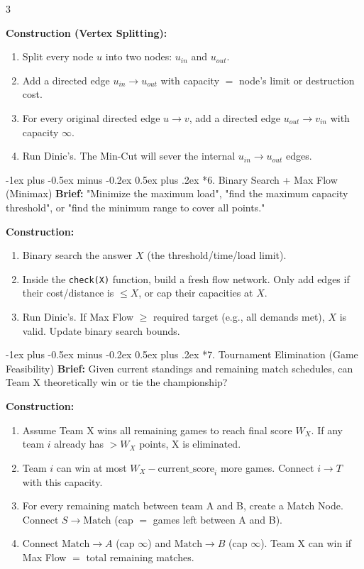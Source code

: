 \documentclass[8pt,a4paper,onesided]{article}
\makeatletter
\renewcommand{\subsection}{\@startsection{subsection}{2}{0mm}
    {-1ex plus -0.5ex minus -0.2ex} %
    {0.5ex plus .2ex}                %
    {\normalfont\large\bfseries}}    %
\makeatother
\begin{document}
\begin{multicols}{3}
{\textbf{Construction (Vertex Splitting):}
\begin{enumerate}
    \item Split every node $u$ into two nodes: $u_{in}$ and $u_{out}$.
    \item Add a directed edge $u_{in} \to u_{out}$ with capacity $=$ node's limit or destruction cost.
    \item For every original directed edge $u \to v$, add a directed edge $u_{out} \to v_{in}$ with capacity $\infty$.
    \item Run Dinic's. The Min-Cut will sever the internal $u_{in} \to u_{out}$ edges.
\end{enumerate}


\subsection*{6. Binary Search + Max Flow (Minimax)}
\textbf{Brief:} "Minimize the maximum load", "find the maximum capacity threshold", or "find the minimum range to cover all points."

\textbf{Construction:}
\begin{enumerate}
    \item Binary search the answer $X$ (the threshold/time/load limit).
    \item Inside the \texttt{check(X)} function, build a fresh flow network. Only add edges if their cost/distance is $\le X$, or cap their capacities at $X$.
    \item Run Dinic's. If Max Flow $\ge$ required target (e.g., all demands met), $X$ is valid. Update binary search bounds.
\end{enumerate}


\subsection*{7. Tournament Elimination (Game Feasibility)}
\textbf{Brief:} Given current standings and remaining match schedules, can Team X theoretically win or tie the championship?

\textbf{Construction:}
\begin{enumerate}
    \item Assume Team X wins all remaining games to reach final score $W_X$. If any team $i$ already has $> W_X$ points, X is eliminated.
    \item Team $i$ can win at most $W_X - \text{current\_score}_i$ more games. Connect $i \to T$ with this capacity.
    \item For every remaining match between team A and B, create a Match Node. Connect $S \to \text{Match}$ (cap $=$ games left between A and B).
    \item Connect $\text{Match} \to A$ (cap $\infty$) and $\text{Match} \to B$ (cap $\infty$). Team X can win if Max Flow $=$ total remaining matches.
\end{enumerate}


}
\end{multicols}
\end{document}
